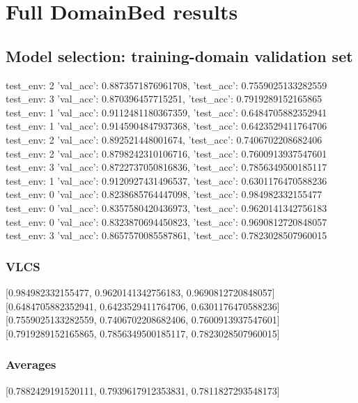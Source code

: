\documentclass{article}
\begin{document}
\section{Full DomainBed results}

\subsection{Model selection: training-domain validation set}
test_env: 2
{'val_acc': 0.8873571876961708, 'test_acc': 0.7559025133282559}
test_env: 3
{'val_acc': 0.870396457715251, 'test_acc': 0.7919289152165865}
test_env: 1
{'val_acc': 0.9112481180367359, 'test_acc': 0.6484705882352941}
test_env: 1
{'val_acc': 0.9145904847937368, 'test_acc': 0.6423529411764706}
test_env: 2
{'val_acc': 0.892521448001674, 'test_acc': 0.7406702208682406}
test_env: 2
{'val_acc': 0.8798242310106716, 'test_acc': 0.7600913937547601}
test_env: 3
{'val_acc': 0.8722737050816836, 'test_acc': 0.7856349500185117}
test_env: 1
{'val_acc': 0.9120927431496537, 'test_acc': 0.6301176470588236}
test_env: 0
{'val_acc': 0.8238685764447098, 'test_acc': 0.984982332155477}
test_env: 0
{'val_acc': 0.8357580420436973, 'test_acc': 0.9620141342756183}
test_env: 0
{'val_acc': 0.8323870694450823, 'test_acc': 0.9690812720848057}
test_env: 3
{'val_acc': 0.8657570085587861, 'test_acc': 0.7823028507960015}

\subsubsection{VLCS}
[0.984982332155477, 0.9620141342756183, 0.9690812720848057]
[0.6484705882352941, 0.6423529411764706, 0.6301176470588236]
[0.7559025133282559, 0.7406702208682406, 0.7600913937547601]
[0.7919289152165865, 0.7856349500185117, 0.7823028507960015]

\begin{center}
\end{center}

\subsubsection{Averages}
[0.7882429191520111, 0.7939617912353831, 0.7811827293548173]

\begin{center}
\end{center}
\end{document}
